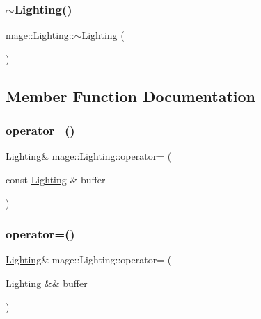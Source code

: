 \hypertarget{structmage_1_1_lighting_a2b357cb6853d05bae8be16fc6d63a6c3}{}\label{structmage_1_1_lighting_a2b357cb6853d05bae8be16fc6d63a6c3} 
\subsubsection{\texorpdfstring{$\sim$\+Lighting()}{~Lighting()}}
{\footnotesize\ttfamily mage\+::\+Lighting\+::$\sim$\+Lighting (\begin{DoxyParamCaption}{ }\end{DoxyParamCaption})\hspace{0.3cm}{\ttfamily [default]}}



\subsection{Member Function Documentation}
\hypertarget{structmage_1_1_lighting_af3407499990673e6a6880cbcc5f5b054}{}\label{structmage_1_1_lighting_af3407499990673e6a6880cbcc5f5b054} 
\subsubsection{\texorpdfstring{operator=()}{operator=()}\hspace{0.1cm}{\footnotesize\ttfamily [1/2]}}
{\footnotesize\ttfamily \hyperlink{structmage_1_1_lighting}{Lighting}\& mage\+::\+Lighting\+::operator= (\begin{DoxyParamCaption}\item[{const \hyperlink{structmage_1_1_lighting}{Lighting} \&}]{buffer }\end{DoxyParamCaption})\hspace{0.3cm}{\ttfamily [default]}}

\hypertarget{structmage_1_1_lighting_adf7079d86353561a08e1729932d5e9e2}{}\label{structmage_1_1_lighting_adf7079d86353561a08e1729932d5e9e2} 
\subsubsection{\texorpdfstring{operator=()}{operator=()}\hspace{0.1cm}{\footnotesize\ttfamily [2/2]}}
{\footnotesize\ttfamily \hyperlink{structmage_1_1_lighting}{Lighting}\& mage\+::\+Lighting\+::operator= (\begin{DoxyParamCaption}\item[{\hyperlink{structmage_1_1_lighting}{Lighting} \&\&}]{buffer }\end{DoxyParamCaption})\hspace{0.3cm}{\ttfamily [default]}}



